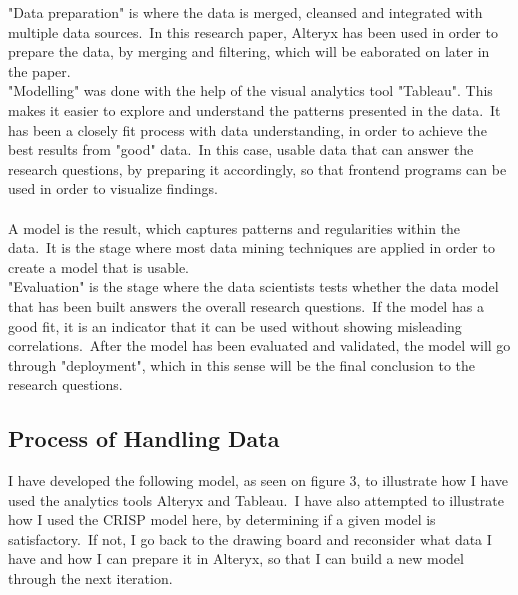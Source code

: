 \documentclass[12pt]{article}
\begin{document}
"Data preparation" is where the data is merged, cleansed and integrated with multiple data sources.\ In this research paper, Alteryx has been used in order to prepare the data, by merging and filtering, which will be eaborated on later in the paper. \\

"Modelling" was done with the help of the visual analytics tool  "Tableau". This makes it easier to explore and understand the patterns presented in the data.\ It has been a closely fit process with data understanding, in order to achieve the best results from "good" data.\ In this case, usable data that can answer the research questions, by  preparing it accordingly, so that frontend programs can be used in order to visualize findings.\ \\ \\ A model is the result,  which captures patterns and regularities within the data.\ It is the stage where most data mining techniques are applied in order to create a model that is usable.\\

 "Evaluation"  is the stage where the data scientists tests whether the data model that has been built answers the overall research questions.\ If the model has a good fit, it is an indicator that it can be used without showing misleading correlations.\ After the model has been evaluated and validated, the model will go through "deployment", which in this sense will be the final conclusion to the research questions.\ 


\subsection{Process of Handling Data}

I have developed the following model, as seen on figure 3, to illustrate how I have used the analytics tools Alteryx and Tableau.\ I have also attempted to illustrate how I used the CRISP model here, by determining if a given model is satisfactory.\ If not, I go back to the drawing board and reconsider what data I have and how I can prepare it in Alteryx, so that I can build a new model through the next iteration.
\end{document}
